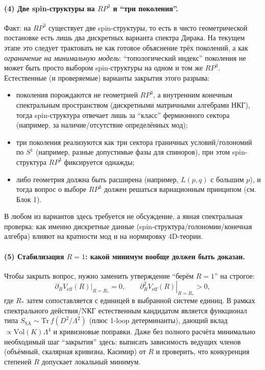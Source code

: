\documentclass[12pt]{article}
\def\mathbb#1{#1}%
\begin{document}
\paragraph{(4) Две spin-структуры на $\mathbb{RP}^3$ и ``три поколения''.}
Факт: на $\mathbb{RP}^3$ существует две spin-структуры, то есть в чисто геометрической постановке есть лишь два дискретных варианта спектра Дирака.
На текущем этапе это следует трактовать не как готовое объяснение трёх поколений, а как \emph{ограничение на минимальную модель}: ``топологический индекс'' поколения не может быть просто выбором spin-структуры на одном и том же $\mathbb{RP}^3$.
Естественные (и проверяемые) варианты закрытия этого разрыва:
\begin{itemize}
  \item поколения порождаются не геометрией $\mathbb{RP}^3$, а внутренним конечным спектральным пространством (дискретными матричными алгебрами НКГ), тогда spin-структура отвечает лишь за ``класс'' фермионного сектора (например, за наличие/отсутствие определённых мод);
  \item три поколения реализуются как три сектора граничных условий/голономий по $S^1$ (например, разные допустимые фазы для спиноров), при этом spin-структура $\mathbb{RP}^3$ фиксируется однажды;
  \item либо геометрия должна быть расширена (например, $L(p,q)$ с большим $p$), и тогда вопрос о выборе $\mathbb{RP}^3$ должен решаться вариационным принципом (см. Блок 1).
\end{itemize}
В любом из вариантов здесь требуется не обсуждение, а явная спектральная проверка: как именно дискретные данные (spin-структура/голономии/конечная алгебра) влияют на кратности мод и на нормировку 4D-теории.

\paragraph{(5) Стабилизация $R=1$: какой минимум вообще должен быть доказан.}
Чтобы закрыть вопрос, нужно заменить утверждение ``берём $R=1$'' на строгое:
\begin{equation}
\left.\partial_R V_{\mathrm{eff}}(R)\right|_{R=R_\ast}=0,
\qquad
\left.\partial_R^2 V_{\mathrm{eff}}(R)\right|_{R=R_\ast}>0,
\end{equation}
где $R_\ast$ затем сопоставляется с единицей в выбранной системе единиц.
В рамках спектрального действия/NКГ естественным кандидатом является функционал типа
$S_{\mathrm{SA}}\sim\mathrm{Tr}\,f(D^2/\Lambda^2)$ (плюс 1-loop детерминанты), дающий вклад $\propto\mathrm{Vol}(K)\Lambda^4$ и кривизновые поправки.
Даже без полного расчёта минимально необходимый шаг ``закрытия'' здесь: выписать зависимость ведущих членов (объёмный, скалярная кривизна, Касимир) от $R$ и проверить, что конкуренция степеней $R$ допускает локальный минимум.
\end{document}
